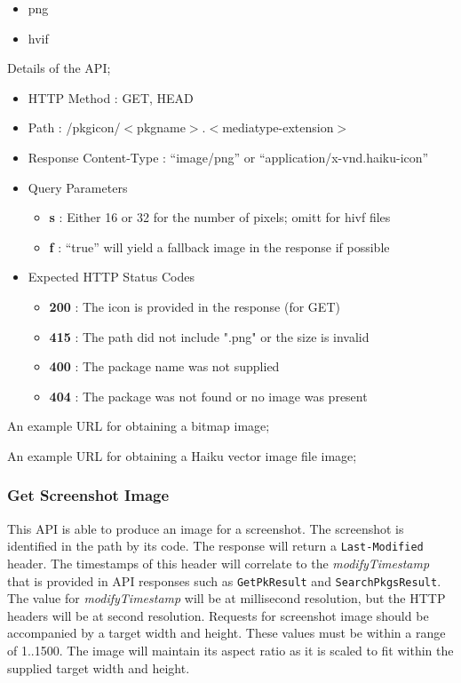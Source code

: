 \begin{itemize}
\item png
\item hvif
\end{itemize}

Details of the API;

\begin{itemize}
\item HTTP Method : GET, HEAD
\item Path : /pkgicon/$<$pkgname$>$.$<$mediatype-extension$>$
\item Response Content-Type : ``image/png'' or ``application/x-vnd.haiku-icon''
\item Query Parameters
  \begin{itemize}
  \item {\bf s} : Either 16 or 32 for the number of pixels; omitt for hivf files
  \item {\bf f} : ``true'' will yield a fallback image in the response if possible
  \end{itemize}
\item Expected HTTP Status Codes
  \begin{itemize}
  \item {\bf 200} : The icon is provided in the response (for GET)
  \item {\bf 415} : The path did not include ".png" or the size is invalid
  \item {\bf 400} : The package name was not supplied
  \item {\bf 404} : The package was not found or no image was present
  \end{itemize}
\end{itemize}

An example URL for obtaining a bitmap image;


An example URL for obtaining a Haiku vector image file image;



\subsubsection{Get Screenshot Image}

This API is able to produce an image for a screenshot.  The screenshot is identified in the path by its code.  The response will return a {\tt Last-Modified} header.  The timestamps of this header will correlate to the {\it modifyTimestamp} that is provided in API responses such as {\tt GetPkResult} and {\tt SearchPkgsResult}.  The value for {\it modifyTimestamp} will be at millisecond resolution, but the HTTP headers will be at second resolution.  Requests for screenshot image should be accompanied by a target width and height.  These values must be within a range of 1..1500.  The image will maintain its aspect ratio as it is scaled to fit within the supplied target width and height.

